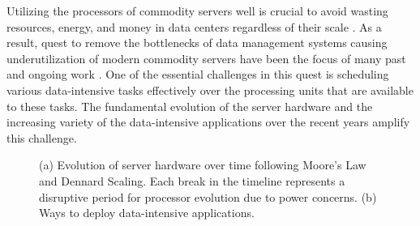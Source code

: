\documentclass[11pt]{article}
\begin{document}
Utilizing the processors of commodity servers well is crucial to avoid wasting
resources, energy, and money in data centers regardless of their scale \cite{Hamilton10}.
As a result, quest to remove the bottlenecks of data management systems causing underutilization
of modern commodity servers have been the focus of many past and ongoing work \cite{AilamakiLTPP17}.
One of the essential challenges in this quest is scheduling various data-intensive tasks
effectively over the processing units that are available to these tasks. 
The fundamental evolution of the server hardware and the increasing variety
of the data-intensive applications over the recent years amplify this challenge.

\begin{figure}
\hfill
{}
\caption{(a) Evolution of server hardware over time following Moore’s Law and Dennard Scaling.
Each break in the timeline represents a disruptive period for processor evolution due to power concerns.
(b) Ways to deploy data-intensive applications.}
\label{fig:hwdia}
\end{figure}
\end{document}
